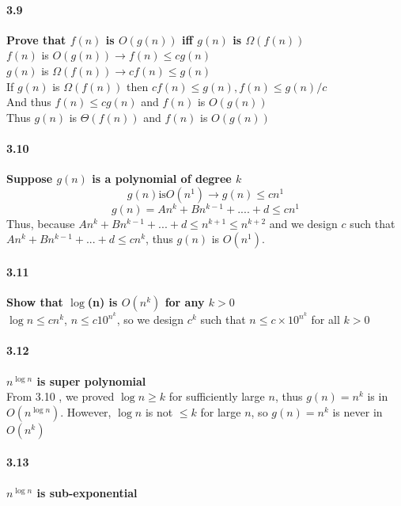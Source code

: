 \paragraph{3.9} \textbf{Prove that $f(n)$ is $O(g(n))$ iff $g(n)$ is $\Omega(f(n))$}
\\

$f(n)$ is $O(g(n)) \rightarrow f(n) \le cg(n)$ \\
$g(n)$ is $\Omega(f(n)) \rightarrow cf(n) \le g(n)$ \\
If $g(n)$ is $\Omega(f(n))$ then $cf(n) \le g(n), f(n) \le g(n) /c$ \\
And thus $f(n) \le cg(n)$ and $f(n)$ is $O(g(n))$ \\

Thus $g(n)$ is $\Theta(f(n))$ and $f(n)$ is $O(g(n))$

\paragraph{3.10} \textbf{Suppose $g(n)$ is a polynomial of degree $k$}
\\

$$ g(n) \text{is} O(n^1) \longrightarrow g(n) \le cn^1$$
$$g(n) = An^k + Bn^{k-1} + .... + d \le cn^1$$
Thus, because $An^k + Bn^{k-1}+...+ d \le n^{k+1} \le n^{k+2}$ and we design $c$ such that $An^k + Bn^{k-1}+...+ d \le cn^k$, thus $g(n)$ is $O(n^1)$.

\paragraph{3.11} \textbf{Show that $\log$(n) is $O(n^k)$ for any $k >0$}
\\

$\log n \le cn^k$, $n \le c 10^{n^k}$, so we design $c^k$ such that $n \le c\times 10^{n^k}$ for all $k>0$

\paragraph{3.12} \textbf{$n^{\log n}$ is super polynomial}
\\

From 3.10 , we proved $\log n \ge k$ for sufficiently large $n$, thus $g(n) = n^k$ is in $O(n^{\log  n})$. However, $\log n$ is not $ \le k$ for large $n$, so $g(n) = n^k$ is never in $O(n^k)$


\paragraph{3.13} \textbf{$n^{\log n}$ is sub-exponential}
\\

